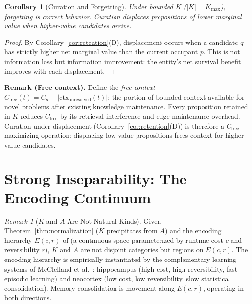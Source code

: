 \documentclass[11pt]{article}
\newtheorem{corollary}[theorem]{Corollary}
\theoremstyle{definition}
\theoremstyle{remark}
\newtheorem*{remark}{Remark}
\begin{document}
\begin{corollary}[Curation and Forgetting]
\label{cor:forgetting}
Under bounded $K$ ($|K| = K_{\max}$), forgetting is correct behavior.
Curation displaces propositions of lower marginal value when higher-value
candidates arrive.
\end{corollary}

\begin{proof}
By Corollary~\ref{cor:retention}(D), displacement occurs when a
candidate $q$ has strictly higher net marginal value than the current
occupant $p$. This is not information loss but information improvement:
the entity's net survival benefit improves with each displacement.
\end{proof}

\textbf{Remark (Free context).}
Define the \emph{free context} $C_{\mathrm{free}}(t) = C_n -
|\mathrm{ctx}_{\mathrm{unresolved}}(t)|$: the portion of bounded context
available for novel problems after existing knowledge maintenance.
Every proposition retained in $K$ reduces $C_{\mathrm{free}}$ by its
retrieval interference and edge maintenance overhead. Curation under
displacement (Corollary~\ref{cor:retention}(D)) is therefore a
$C_{\mathrm{free}}$-maximizing operation: displacing low-value
propositions frees context for higher-value candidates.

\section{Strong Inseparability: The Encoding Continuum}
\label{sec:continuum}

\begin{remark}[$K$ and $A$ Are Not Natural Kinds]
\label{rem:continuum}
Given Theorem~\ref{thm:normalization} ($K$ precipitates from $A$) and
the encoding hierarchy $E(c,r)$ of \cite{McCarthy2026b} (a continuous
space parameterized by runtime cost $c$ and reversibility $r$), $K$ and
$A$ are not disjoint categories but regions on $E(c,r)$. The encoding
hierarchy is empirically instantiated by the complementary learning
systems of McClelland et al.\ \cite{McClelland1995}: hippocampus (high
cost, high reversibility, fast episodic learning) and neocortex (low
cost, low reversibility, slow statistical consolidation). Memory
consolidation is movement along $E(c,r)$, operating in both directions.
\end{remark}
\end{document}
